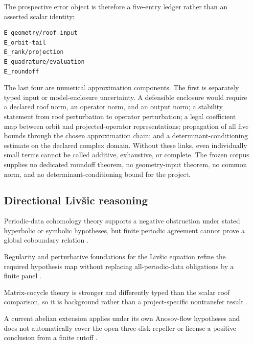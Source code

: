 \documentclass[11pt,a4paper]{article}
\begin{document}
The prospective error object is therefore a five-entry ledger rather than an asserted scalar identity:

\begin{verbatim}
E_geometry/roof-input
E_orbit-tail
E_rank/projection
E_quadrature/evaluation
E_roundoff
\end{verbatim}

The last four are numerical approximation components. The first is separately typed input or model-enclosure uncertainty. A defensible enclosure would require a declared roof norm, an operator norm, and an output norm; a stability statement from roof perturbation to operator perturbation; a legal coefficient map between orbit and projected-operator representations; propagation of all five bounds through the chosen approximation chain; and a determinant-conditioning estimate on the declared complex domain. Without these links, even individually small terms cannot be called additive, exhaustive, or complete. The frozen corpus supplies no dedicated roundoff theorem, no geometry-input theorem, no common norm, and no determinant-conditioning bound for the project.

\subsection{Directional Livšic reasoning}

Periodic-data cohomology theory supports a negative obstruction under stated hyperbolic or symbolic hypotheses, but finite periodic agreement cannot prove a global coboundary relation
\citep{P30-S23}.

Regularity and perturbative foundations for the Livšic equation refine the required hypothesis map without replacing all-periodic-data obligations by a finite panel
\citep{P30-S24}.

Matrix-cocycle theory is stronger and differently typed than the scalar roof comparison, so it is background rather than a project-specific nontransfer result
\citep{P30-S25}.

A current abelian extension applies under its own Anosov-flow hypotheses and does not automatically cover the open three-disk repeller or license a positive conclusion from a finite cutoff
\citep{P30-S26}.
\end{document}
